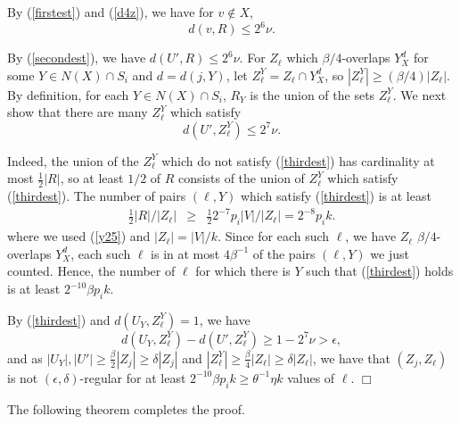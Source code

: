 \documentclass[11pt]{article}
\newenvironment{proof}
      {\medskip\noindent{\bf Proof:}\hspace{1mm}}
      {\hfill$\Box$\medskip}
\begin{document}
\begin{proof}
By (\ref{firstest}) and (\ref{d4z}), we have for $v \not \in X$,
\begin{equation}\label{secondest}
d(v,R)\leq  2^6\nu. \end{equation}

By (\ref{secondest}), we have $d(U',R) \leq 2^6\nu$.
For $Z_{\ell}$ which $\beta/4$-overlaps $Y^d_X$ for some $Y \in N(X) \cap S_i$
and $d=d(j,Y)$, let $Z_{\ell}^Y=Z_{\ell} \cap Y^d_X$, so $|Z_{\ell}^Y|
\geq (\beta/4)|Z_{\ell}|$. By definition, for each $Y \in N(X) \cap S_i$, $R_Y$ is the
union of the sets $Z_{\ell}^Y$. We next show that there are many $Z_{\ell}^Y$ which satisfy
\begin{equation}\label{thirdest}
d(U',Z_{\ell}^Y) \leq 2^7\nu.
\end{equation}

Indeed, the union of the $Z_{\ell}^Y$ which do not satisfy (\ref{thirdest}) has
cardinality at most $\frac{1}{2}|R|$, so at least
$1/2$ of $R$ consists of the union of $Z_{\ell}^Y$ which satisfy
(\ref{thirdest}).
The number of pairs $(\ell,Y)$  which satisfy (\ref{thirdest}) is at least
\begin{eqnarray*} \frac{1}{2}|R|/|Z_\ell| & \geq & \frac{1}{2}2^{-7}p_i|V|/|Z_{\ell}|=2^{-8}p_ik. 
\end{eqnarray*}
where we used (\ref{y25}) and $|Z_{\ell}|=|V|/k$. Since for each such $\ell$, we have $Z_{\ell}$
$\beta/4$-overlaps
$Y_X^d$, each such $\ell$ is in at most $4\beta^{-1}$ of the pairs $(\ell,Y)$
we just
counted. Hence, the number of $\ell$ for which there is $Y$ such that
(\ref{thirdest}) holds is at least $2^{-10}\beta p_i k$.

By (\ref{thirdest}) and $d(U_Y,Z_{\ell}^Y)=1$,
we have $$d(U_Y,Z_{\ell}^Y)-d(U',Z_{\ell}^Y) \geq 1-2^7\nu>\epsilon,$$
and as $|U_Y|,|U'| \geq \frac{\beta}{2}|Z_j| \geq \delta |Z_j|$ and
$|Z_{\ell}^Y| \geq \frac{\beta}{4} |Z_{\ell}| \geq \delta |Z_{\ell}|$, we have
that $(Z_j,Z_{\ell})$ is not $(\epsilon,\delta)$-regular for at least
$2^{-10}\beta p_i k \geq \theta^{-1}\eta k$ values of $\ell$.
\end{proof}

The following theorem completes the proof.
\end{document}
